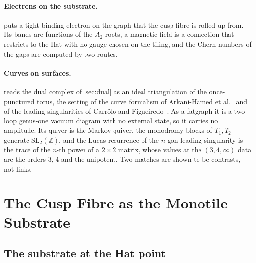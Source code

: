 \documentclass[11pt,a4paper]{article}
\newcommand{\ZZ}{\mathbb{Z}}
\newcommand{\SL}{\mathrm{SL}}
\theoremstyle{plain}
\theoremstyle{definition}
\begin{document}
\paragraph{Electrons on the substrate.}  puts a tight-binding electron on the graph that the cusp fibre
is rolled up from. Its bands are functions of the $A_2$ roots, a magnetic field is a connection that restricts to the Hat with no gauge
chosen on the tiling, and the Chern numbers of the gaps are computed by two routes.

\paragraph{Curves on surfaces.}  reads the dual complex of \cref{sec:dual} as an ideal triangulation of the
once-punctured torus, the setting of the curve formalism of Arkani-Hamed et al.~\cite{AHFPT} and of the leading singularities of
Carr\^olo and Figueiredo~\cite{CF}. As a fatgraph it is a two-loop genus-one vacuum diagram with no external state, so it carries no amplitude. Its quiver is the Markov quiver, the monodromy blocks of $T_1,T_2$ generate $\SL_2(\ZZ)$, and the Lucas
recurrence of the $n$-gon leading singularity is the trace of the $n$-th power of a $2\times2$ matrix, whose values at the
$(3,4,\infty)$ data are the orders $3$, $4$ and the unipotent. Two matches are shown to be contrasts, not links.


\section{The Cusp Fibre as the Monotile Substrate}
\label{sec:laves}

\subsection{The substrate at the Hat point}
\end{document}
